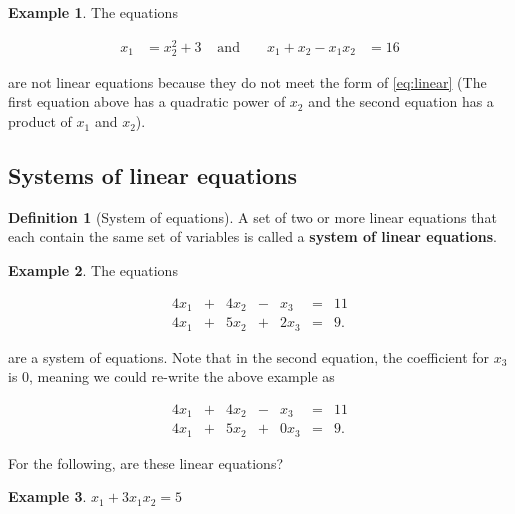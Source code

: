 \documentclass[
]{book}
\theoremstyle{definition}
\newtheorem{definition}{Definition}[chapter]
\theoremstyle{definition}
\newtheorem{example}{Example}[chapter]
\theoremstyle{definition}
\theoremstyle{remark}
\begin{document}
\begin{example}
\protect\hypertarget{exm:unnamed-chunk-22}{}{\label{exm:unnamed-chunk-22} }The equations

\[
\begin{aligned}
x_1 & = x_2^2 + 3
& \mbox{ and } && 
x_1 + x_2 - x_1 x_2 & = 16
\end{aligned}
\]

are not linear equations because they do not meet the form of \eqref{eq:linear} (The first equation above has a quadratic power of \(x_2\) and the second equation has a product of \(x_1\) and \(x_2\)).
\end{example}

\hypertarget{systems-of-linear-equations}{%
\subsection{Systems of linear equations}\label{systems-of-linear-equations}}

\begin{definition}[System of equations]
\protect\hypertarget{def:unnamed-chunk-23}{}{\label{def:unnamed-chunk-23} {} }A set of two or more linear equations that each contain the same set of variables is called a \textbf{system of linear equations}.
\end{definition}

\begin{example}
\protect\hypertarget{exm:unnamed-chunk-24}{}{\label{exm:unnamed-chunk-24} }The equations

\begin{alignat*}{4}
x_1   & {}+{} & 4 x_2 & {}-{} & x_3 & {}={} & 11 \\
4 x_1 & {}+{} & 5 x_2 & {}+{} & 2 x_3 & {}={} & 9.
\end{alignat*}

are a system of equations. Note that in the second equation, the coefficient for \(x_3\) is 0, meaning we could re-write the above example as

\begin{alignat*}{4}
x_1   & {}+{} & 4 x_2 & {}-{} & x_3 & {}={} & 11 \\
4 x_1 & {}+{} & 5 x_2 & {}+{} & 0 x_3 & {}={} & 9.
\end{alignat*}
\end{example}

For the following, are these linear equations?

\begin{example}
\protect\hypertarget{exm:unnamed-chunk-25}{}{\label{exm:unnamed-chunk-25} }\(x_1 + 3 x_1 x_2 = 5\)
\end{example}
\end{document}
